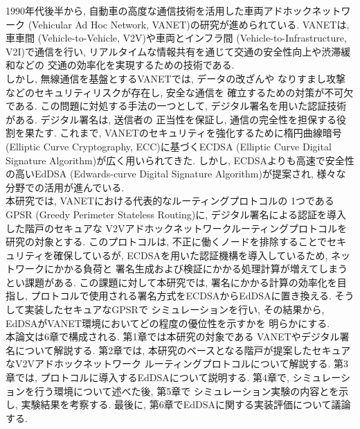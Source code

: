 1990年代後半から, 自動車の高度な通信技術を活用した車両アドホックネットワーク
 (Vehicular Ad Hoc Network, VANET)の研究が進められている. 
VANETは, 車車間 (Vehicle-to-Vehicle, V2V)や車両とインフラ間
 (Vehicle-to-Infrastructure, V2I)で通信を行い, 
リアルタイムな情報共有を通じて交通の安全性向上や渋滞緩和などの
交通の効率化を実現するための技術である. \\
\indent しかし, 無線通信を基盤とするVANETでは, データの改ざんや
なりすまし攻撃などのセキュリティリスクが存在し, 安全な通信を
確立するための対策が不可欠である. この問題に対処する手法の一つとして, 
デジタル署名を用いた認証技術がある. デジタル署名は, 送信者の
正当性を保証し, 通信の完全性を担保する役割を果たす. これまで, 
VANETのセキュリティを強化するために楕円曲線暗号 
(Elliptic Curve Cryptography, ECC)に基づくECDSA 
(Elliptic Curve Digital Signature Algorithm)が広く用いられてきた\cite{ravi}. 
しかし, ECDSAよりも高速で安全性の高いEdDSA 
(Edwards-curve Digital Signature Algorithm)が提案され, 
様々な分野での活用が進んでいる. \\
\indent 本研究では, VANETにおける代表的なルーティングプロトコルの
1つであるGPSR (Greedy Perimeter Stateless Routing)に, 
デジタル署名による認証を導入した階戸のセキュアな
V2Vアドホックネットワークルーティングプロトコル\cite{shinato}を研究の対象とする. 
このプロトコルは, 不正に働くノードを排除することでセキュリティを確保しているが, 
ECDSAを用いた認証機構を導入しているため, ネットワークにかかる負荷と
署名生成および検証にかかる処理計算が増えてしまうとい課題がある. 
この課題に対して本研究では, 署名にかかる計算の効率化を目指し,  
プロトコルで使用される署名方式をECDSAからEdDSAに置き換える. そうして実装したセキュアなGPSRで
シミュレーションを行い, その結果から, EdDSAがVANET環境においてどの程度の優位性を示すかを
明らかにする. \\
\indent 本論文は6章で構成される. 第1章では本研究の対象である
VANETやデジタル署名について解説する. 第2章では, 
本研究のベースとなる階戸が提案したセキュアなV2Vアドホックネットワーク
ルーティングプロトコル\cite{shinato}について解説する. 第3章では, 
プロトコルに導入するEdDSAについて説明する. 第4章で, 
シミュレーションを行う環境について述べた後, 第5章で
シミュレーション実験の内容とを示し, 実験結果を考察する. 
最後に, 第6章でEdDSAに関する実装評価について議論する. 

